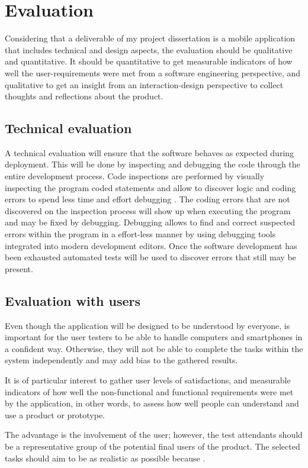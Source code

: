 \section{Evaluation}
Considering that a deliverable of my project dissertation is a mobile application that includes technical and design aspects, the evaluation should be qualitative and quantitative. It should be quantitative to get measurable indicators of how well the user-requirements were met from a software engineering perspective, and qualitative to get an insight from an interaction-design perspective to collect thoughts and reflections about the product.

\subsection{Technical evaluation}
A technical evaluation will ensure that the software behaves as expected during deployment. This will be done by inspecting and debugging the code through the entire development process. Code inspections are performed by visually inspecting the program coded statements and allow to discover logic and coding errors to spend less time and effort debugging \cite{Myers2011}. The coding errors that are not discovered on the inspection process will show up when executing the program and may be fixed by debugging. Debugging allows to find and correct suspected errors within the program in a effort-less manner by using debugging tools integrated into modern development editors. Once the software development has been exhausted automated tests will be used to discover errors that still may be present.

\subsection{Evaluation with users}
Even though the application will be designed to be understood by everyone, is important for the user testers to be able to handle computers and smartphones in a confident way. Otherwise, they will not be able to complete the tasks within the system independently and may add bias to the gathered results. 

It is of particular interest to gather user levels of satisfactions, and measurable indicators of how well the non-functional and functional requirements were met by the application, in other words, to assess how well people can understand and use a product or prototype.

 \cite{Scholtz2003} The advantage is the involvement of the user; however, the test attendants should be a representative group of the potential final users of the product. The selected tasks should aim to be as realistic as possible because . \cite{Scholtz2003}

